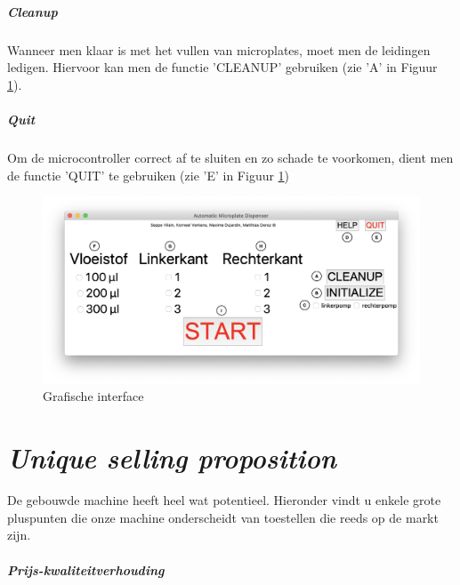 \documentclass[a4paper,twoside,kulak]{kulakreport} %
\begin{document}
\paragraph{Cleanup}
Wanneer men klaar is met het vullen van microplates, moet men de leidingen ledigen. Hiervoor kan men de functie 'CLEANUP' gebruiken (zie 'A' in Figuur \ref{fig: Grafische interface}).
\paragraph{Quit}
Om de microcontroller correct af te sluiten en zo schade te voorkomen, dient men de functie 'QUIT' te gebruiken (zie 'E' in Figuur \ref{fig: Grafische interface})

\begin{figure}[h]

	\includegraphics[width=\linewidth]{GI_letters.png}
	\caption{Grafische interface}
	\label{fig: Grafische interface}
	
\end{figure} 



\chapter{\textit{Unique selling proposition}}

De gebouwde machine heeft heel wat potentieel. Hieronder vindt u enkele grote pluspunten die onze machine onderscheidt van toestellen die reeds op de markt zijn.

\paragraph{Prijs-kwaliteitverhouding}
\end{document}
